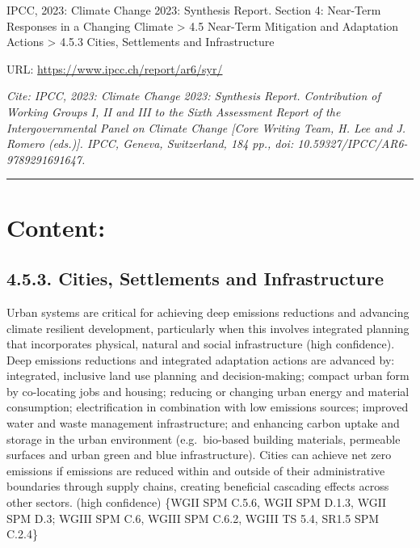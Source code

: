 \documentclass[
  letterpaper,
  DIV=11,
  numbers=noendperiod]{scrreprt}
\begin{document}
IPCC, 2023: Climate Change 2023: Synthesis Report. Section 4: Near-Term
Responses in a Changing Climate \textgreater{} 4.5 Near-Term Mitigation
and Adaptation Actions \textgreater{} 4.5.3 Cities, Settlements and
Infrastructure

URL: \url{https://www.ipcc.ch/report/ar6/syr/}

\emph{Cite: IPCC, 2023: Climate Change 2023: Synthesis Report.
Contribution of Working Groups I, II and III to the Sixth Assessment
Report of the Intergovernmental Panel on Climate Change {[}Core Writing
Team, H. Lee and J. Romero (eds.){]}. IPCC, Geneva, Switzerland, 184
pp., doi: 10.59327/IPCC/AR6-9789291691647.}

\begin{center}\rule{0.5\linewidth}{0.5pt}\end{center}

\hypertarget{content-3}{%
\section{Content:}\label{content-3}}

\hypertarget{cities-settlements-and-infrastructure}{%
\subsection{4.5.3. Cities, Settlements and
Infrastructure}\label{cities-settlements-and-infrastructure}}

Urban systems are critical for achieving deep emissions reductions and
advancing climate resilient development, particularly when this involves
integrated planning that incorporates physical, natural and social
infrastructure (high confidence). Deep emissions reductions and
integrated adaptation actions are advanced by: integrated, inclusive
land use planning and decision-making; compact urban form by co-locating
jobs and housing; reducing or changing urban energy and material
consumption; electrification in combination with low emissions sources;
improved water and waste management infrastructure; and enhancing carbon
uptake and storage in the urban environment (e.g.~bio-based building
materials, permeable surfaces and urban green and blue infrastructure).
Cities can achieve net zero emissions if emissions are reduced within
and outside of their administrative boundaries through supply chains,
creating beneficial cascading effects across other sectors. (high
confidence) \{WGII SPM C.5.6, WGII SPM D.1.3, WGII SPM D.3; WGIII SPM
C.6, WGIII SPM C.6.2, WGIII TS 5.4, SR1.5 SPM C.2.4\}
\end{document}

